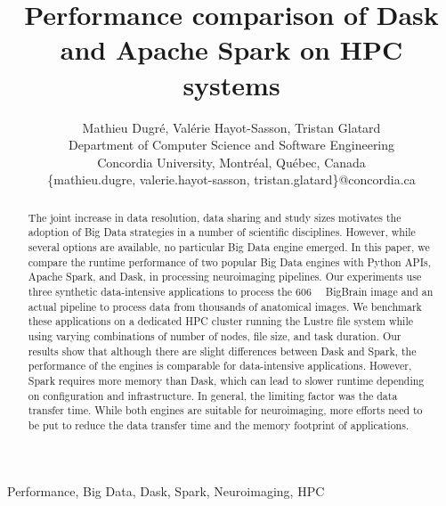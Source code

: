 \documentclass[conference]{IEEEtran}
\begin{document}
\title{Performance comparison of Dask and Apache Spark on HPC systems}

\author{Mathieu Dugr\'e, Val\'erie Hayot-Sasson, Tristan Glatard\\
	Department of Computer Science and Software Engineering\\
	Concordia University, Montr\'eal, Qu\'ebec, Canada\\
	\{mathieu.dugre, valerie.hayot-sasson, tristan.glatard\}@concordia.ca
	\vspace*{0.8cm} %
}

\maketitle

\begin{abstract}
	The joint increase in data resolution, data sharing and
	study sizes motivates the adoption of Big Data strategies in a number of scientific disciplines.
	However, while several options are available, no particular Big Data engine emerged.
	In this paper, we compare the runtime performance of two popular Big Data engines with
	Python APIs, Apache Spark, and Dask, in processing neuroimaging pipelines.
	Our experiments use three synthetic data-intensive applications to process
	the \SI{606}{\gibi\byte} BigBrain image and an actual pipeline to process data
	from thousands of anatomical images.
	We benchmark these applications on a dedicated HPC cluster running the Lustre file system while using varying
	combinations of number of nodes, file size, and task duration.
	Our results show that although there are slight differences between Dask and Spark,
	the performance of the engines is comparable for data-intensive applications.
	However, Spark requires more memory than Dask, which can lead to 
	slower runtime depending on configuration and infrastructure.
	In general, the limiting factor was the data transfer time.
	While both engines are suitable for neuroimaging, more efforts need to be put
	to reduce the data transfer time and the memory footprint of applications.
						
\end{abstract}

\begin{IEEEkeywords}
	Performance, Big Data, Dask, Spark, Neuroimaging, HPC
\end{IEEEkeywords}
\end{document}
